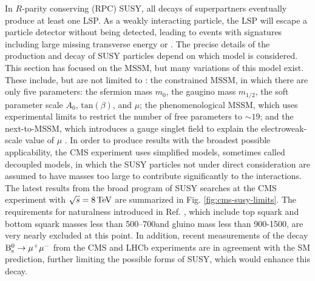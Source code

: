 In $R$-parity conserving (RPC) SUSY, all decays of superpartners eventually produce at least one LSP. As a weakly interacting particle, the LSP will escape a particle detector without being detected, leading to events with signatures including large missing transverse energy or \met. The precise details of the production and decay of SUSY particles depend on which model is considered. This section has focused on the MSSM, but many variations of this model exist. These include, but are not limited to \cite{PDG}: the constrained MSSM, in which there are only five parameters: the sfermion mass $m_0$, the gaugino mass $m_{1/2}$, the soft parameter scale $A_{0}$, $\text{tan}(\beta)$, and $\mu$; the phenomenological MSSM, which uses experimental limits to restrict the number of free parameters to ${\sim}19$; and the next-to-MSSM, which introduces a gauge singlet field to explain the electroweak-scale value of $\mu$ \cite{NMSSM}. In order to produce results with the broadest possible applicability, the CMS experiment uses simplified models, sometimes called decoupled models, in which the SUSY particles not under direct consideration are assumed to have masses too large to contribute significantly to the interactions. The latest results from the broad program of SUSY searches at the CMS experiment with $\sqrt{s}=8\,\text{Te\hspace{-.08em}V}$ are summarized in Fig. \ref{fig:cms-susy-limits}. The requirements for naturalness introduced in Ref. \cite{NaturalSUSY}, which include top squark and bottom squark masses less than 500--700\GeV and gluino mass less than 900-1500\GeV, are very nearly excluded at this point. In addition, recent measurements of the decay $\mathrm{B}^{0}_{\mathrm{s}} \rightarrow \mu^{+} \mu^{-}$ from the CMS \cite{CMS-BSmumu} and LHCb \cite{LHCb-BSmumu} experiments are in agreement with the SM prediction, further limiting the possible forms of SUSY, which would enhance this decay.

